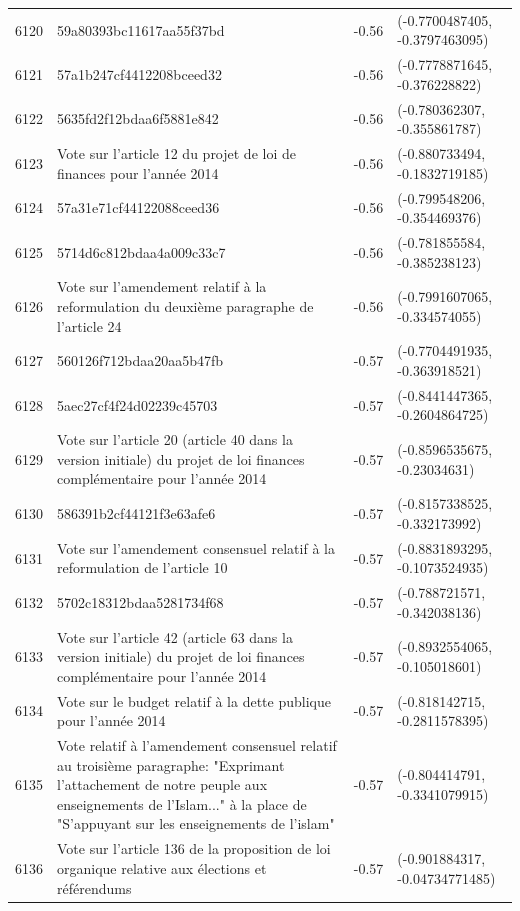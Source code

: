 \begin{table}[ht]
\begin{tabular}{rlrl}
  6120 & 59a80393bc11617aa55f37bd & -0.56 & (-0.7700487405, -0.3797463095) \\ 
  6121 & 57a1b247cf4412208bceed32 & -0.56 & (-0.7778871645, -0.376228822) \\ 
  6122 & 5635fd2f12bdaa6f5881e842 & -0.56 & (-0.780362307, -0.355861787) \\ 
  6123 & Vote sur l'article 12 du projet de loi de finances pour l'année 2014 & -0.56 & (-0.880733494, -0.1832719185) \\ 
  6124 & 57a31e71cf44122088ceed36 & -0.56 & (-0.799548206, -0.354469376) \\ 
  6125 & 5714d6c812bdaa4a009c33c7 & -0.56 & (-0.781855584, -0.385238123) \\ 
  6126 & Vote sur l'amendement relatif à la reformulation du deuxième paragraphe de l'article 24 & -0.56 & (-0.7991607065, -0.334574055) \\ 
  6127 & 560126f712bdaa20aa5b47fb & -0.57 & (-0.7704491935, -0.363918521) \\ 
  6128 & 5aec27cf4f24d02239c45703 & -0.57 & (-0.8441447365, -0.2604864725) \\ 
  6129 & Vote sur l'article 20 (article 40 dans la version initiale) du projet de loi finances complémentaire pour l'année 2014 & -0.57 & (-0.8596535675, -0.23034631) \\ 
  6130 & 586391b2cf44121f3e63afe6 & -0.57 & (-0.8157338525, -0.332173992) \\ 
  6131 & Vote sur l'amendement consensuel relatif à la reformulation de l'article 10 & -0.57 & (-0.8831893295, -0.1073524935) \\ 
  6132 & 5702c18312bdaa5281734f68 & -0.57 & (-0.788721571, -0.342038136) \\ 
  6133 & Vote sur l'article 42 (article 63 dans la version initiale) du projet de loi finances complémentaire pour l'année 2014 & -0.57 & (-0.8932554065, -0.105018601) \\ 
  6134 & Vote sur le budget relatif à la dette publique pour l'année 2014 & -0.57 & (-0.818142715, -0.2811578395) \\ 
  6135 & Vote relatif à l'amendement consensuel relatif au troisième paragraphe: "Exprimant l’attachement de notre peuple aux enseignements de l’Islam..." à la place de "S’appuyant sur les enseignements de l’islam" & -0.57 & (-0.804414791, -0.3341079915) \\ 
  6136 & Vote sur l'article 136 de la proposition de loi organique relative aux élections et référendums & -0.57 & (-0.901884317, -0.04734771485) \\ 

\end{tabular}
\end{table}
